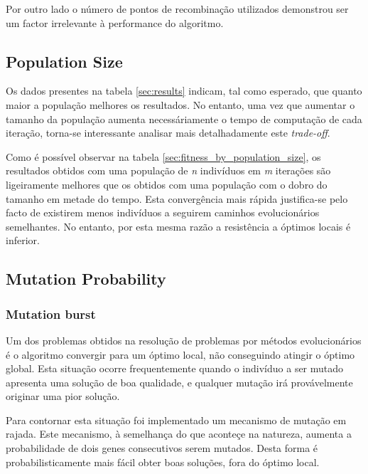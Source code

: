 \documentclass[a4paper]{article}
\begin{document}
\indent Por outro lado o número de pontos de recombinação utilizados demonstrou ser um factor irrelevante à performance do algoritmo.

\cleardoublepage
\subsection{Population Size}
\indent \indent Os dados presentes na tabela \ref{sec:results} indicam, tal como esperado, que quanto maior a população melhores
os resultados. No entanto, uma vez que aumentar o tamanho da população aumenta necessáriamente
o tempo de computação de cada iteração, torna-se interessante analisar mais detalhadamente este \emph{trade-off}.

\indent Como é possível observar na tabela \ref{sec:fitness_by_population_size}, os resultados obtidos com uma
população de \emph{n} indivíduos em \emph{m} iterações são ligeiramente melhores que os obtidos
com uma população com o dobro do tamanho em metade do tempo. Esta convergência mais rápida justifica-se
pelo facto de existirem menos indivíduos a seguirem caminhos evolucionários semelhantes. No entanto, por esta
mesma razão a resistência a óptimos locais é inferior.
 
\cleardoublepage

\subsection{Mutation Probability}
\indent \indent 

\subsubsection{Mutation burst}
\indent \indent Um dos problemas obtidos na resolução de problemas por métodos evolucionários é o algoritmo
convergir para um óptimo local, não conseguindo atingir o óptimo global. Esta situação ocorre frequentemente
quando o indivíduo a ser mutado apresenta uma solução de boa qualidade, e qualquer mutação irá provávelmente originar
uma pior solução.

\indent Para contornar esta situação foi implementado um mecanismo de mutação em rajada. Este mecanismo, à semelhança
do que aconteçe na natureza, aumenta a probabilidade de dois genes consecutivos serem mutados. Desta forma é probabilisticamente
mais fácil obter boas soluções, fora do óptimo local. 
\end{document}
